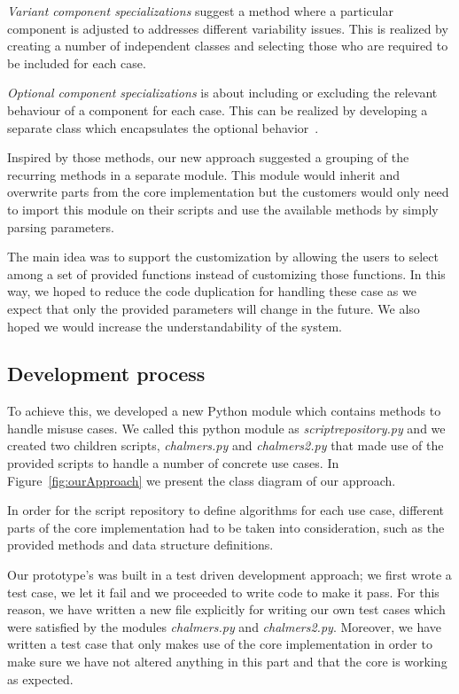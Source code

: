 \textit{Variant component specializations} suggest a method where a particular component is adjusted to addresses different variability issues. This is realized by creating a number of independent classes and selecting those who are required to be included for each case. 

\textit{Optional component specializations} is about including or excluding the relevant behaviour of a component for each case. This can be realized by developing a separate class which encapsulates the optional behavior~\cite{JillesVanGurp2001}. %
 

Inspired by those methods, our new approach suggested a grouping of the recurring methods in a separate module. This module would inherit and overwrite parts from the core implementation but the customers would only need to import this module on their scripts and use the available methods by simply parsing parameters. 

The main idea was to support the customization by allowing the users to select among a set of provided functions instead of customizing those functions.
In this way, we hoped to reduce the code duplication for handling these case as we expect that only the provided parameters will change in the future. We also hoped we would increase the understandability of the system. 

\subsection{Development process}
To achieve this, we developed a new Python module which contains methods to handle misuse cases. We called this python module as \textit{script\textunderscore repository.py} and we created two children scripts, \textit{chalmers.py} and \textit{chalmers2.py} that made use of the provided scripts to handle a number of concrete use cases. In Figure~\ref{fig:ourApproach} we present the class diagram of our approach.






In order for the script repository to define algorithms for each use case, different parts of the core implementation had to be taken into consideration, such as the provided methods and data structure definitions. 


Our prototype's was built in a test driven development approach; we first wrote a test case, we let it fail and we proceeded to write code to make it pass. For this reason, we have written a new file explicitly for writing our own test cases which were satisfied by the modules  \textit{chalmers.py} and \textit{chalmers2.py}. Moreover, we have written a test case that only makes use of the core implementation in order to make sure we have not altered anything in this part and that the core is working as expected. 

